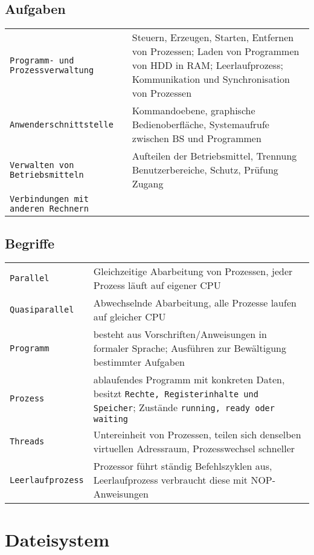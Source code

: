 \subsection{Aufgaben}
\begin{tabular}{@{}p{\the\MyLen}%
		@{}p{\linewidth-\the\MyLen}@{}}
	\texttt{Programm- und Prozessverwaltung} & Steuern, Erzeugen, Starten, Entfernen von Prozessen; Laden von Programmen von HDD in RAM; Leerlaufprozess; Kommunikation und Synchronisation von Prozessen\\
	\texttt{Anwenderschnittstelle} & Kommandoebene, graphische Bedienoberfläche, Systemaufrufe zwischen BS und Programmen\\
	\texttt{Verwalten von Betriebsmitteln} & Aufteilen der Betriebsmittel, Trennung Benutzerbereiche, Schutz, Prüfung Zugang\\
	\texttt{Verbindungen mit anderen Rechnern} & \\
\end{tabular}

\subsection{Begriffe}
\begin{tabular}{@{}p{\the\MyLen}%
		@{}p{\linewidth-\the\MyLen}@{}}
	\texttt{Parallel} & Gleichzeitige Abarbeitung von Prozessen, jeder Prozess läuft auf eigener CPU\\
	\texttt{Quasiparallel} & Abwechselnde Abarbeitung, alle Prozesse laufen auf gleicher CPU\\
	\texttt{Programm} & besteht aus Vorschriften/Anweisungen in formaler Sprache; Ausführen zur Bewältigung bestimmter Aufgaben\\
	\texttt{Prozess} & ablaufendes Programm mit konkreten Daten, besitzt \texttt{Rechte, Registerinhalte und Speicher}; Zustände \texttt{running, ready oder waiting}\\
	\texttt{Threads} & Untereinheit von Prozessen, teilen sich denselben virtuellen Adressraum, Prozesswechsel schneller\\
	\texttt{Leerlaufprozess} & Prozessor führt ständig Befehlszyklen aus, Leerlaufprozess verbraucht diese mit NOP-Anweisungen\\
\end{tabular}

\section{Dateisystem}
